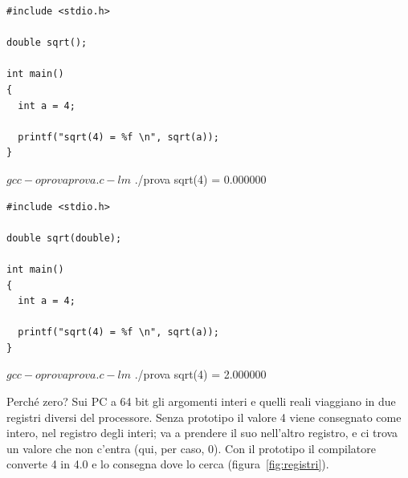 \begin{affianco}[0.5][t]
\begin{lstlisting}[style=c, name=prova.c]
#include <stdio.h>

double sqrt();

int main()
{
  int a = 4;

  printf("sqrt(4) = %f \n", sqrt(a));
}
\end{lstlisting}
\begin{console}
$ gcc -o prova prova.c -lm
$ ./prova
sqrt(4) = 0.000000
\end{console}
\risultato
\begin{lstlisting}[style=c, name=prova.c]
#include <stdio.h>

double sqrt(double);

int main()
{
  int a = 4;

  printf("sqrt(4) = %f \n", sqrt(a));
}
\end{lstlisting}
\begin{console}
$ gcc -o prova prova.c -lm
$ ./prova
sqrt(4) = 2.000000
\end{console}
\end{affianco}

Perché zero? Sui PC a 64 bit gli argomenti interi e quelli reali viaggiano in
due registri diversi del processore. Senza prototipo il valore 4 viene
consegnato come intero, nel registro degli interi;  va a prendere
il suo  nell'altro registro, e ci trova un valore che non
c'entra (qui, per caso, 0). Con il prototipo il compilatore converte 4 in
4.0 e lo consegna dove  lo cerca (figura~\ref{fig:registri}).

